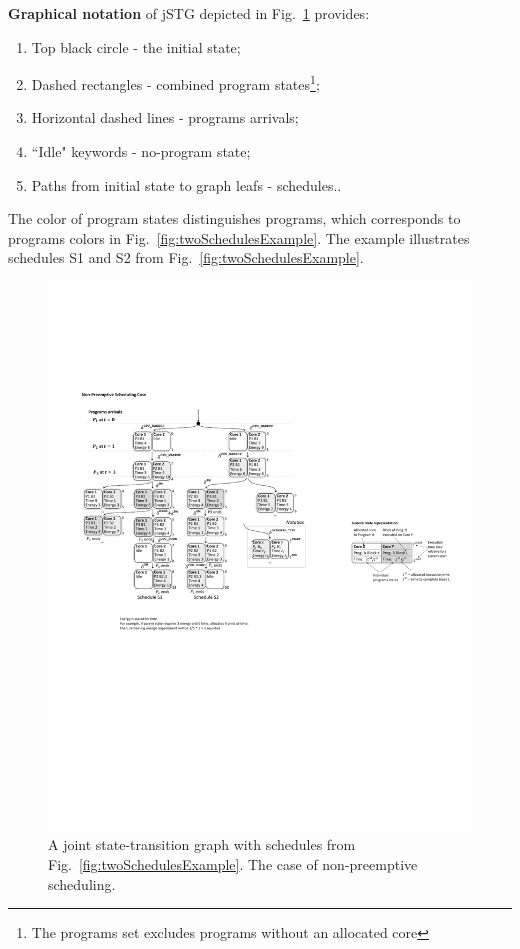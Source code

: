 
\textbf{Graphical notation} of jSTG depicted in Fig.~\ref{fig:jSTGExample} provides:
\begin{enumerate}
\item Top black circle \-- the initial state;
\item Dashed rectangles \-- combined program states\footnote{The programs set excludes programs without an allocated core};
\item Horizontal dashed lines \-- programs arrivals;
\item ``Idle" keywords \-- no-program state;
\item Paths from initial state to graph leafs \-- schedules..
\end{enumerate}
The color of program states distinguishes programs, which corresponds to programs colors in Fig.~\ref{fig:twoSchedulesExample}.  The example illustrates schedules S1 and S2 from Fig.~\ref{fig:twoSchedulesExample}.

\begin{figure}
\center
\includegraphics[width=.9\textwidth]{figs/jSTG.pdf}
\caption{A joint state-transition graph with schedules from Fig.~\ref{fig:twoSchedulesExample}. The case of non-preemptive scheduling.}
\label{fig:jSTGExample}
\end{figure}

